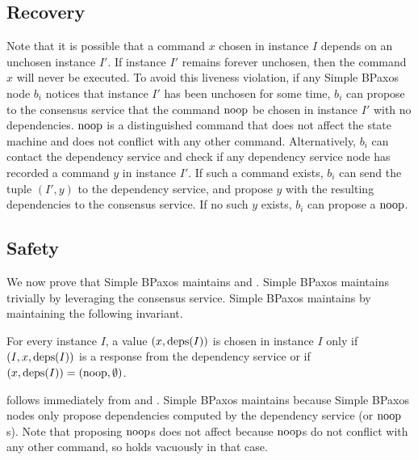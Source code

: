 \subsection{Recovery}
Note that it is possible that a command $x$ chosen in instance $I$ depends on
an unchosen instance $I'$. If instance $I'$ remains forever unchosen, then the
command $x$ will never be executed. To avoid this liveness violation, if any
Simple BPaxos node $b_i$ notices that instance $I'$ has been unchosen for some
time, $b_i$ can propose to the consensus service that the command $\text{noop}$ be
chosen in instance $I'$ with no dependencies. $\text{noop}$ is a distinguished
command that does not affect the state machine and does not conflict with any
other command.
%
Alternatively, $b_i$ can contact the dependency service and check if any
dependency service node has recorded a command $y$ in instance $I'$. If such a
command exists, $b_i$ can send the tuple $(I', y)$ to the dependency service,
and propose $y$ with the resulting dependencies to the consensus service. If no
such $y$ exists, $b_i$ can propose a $\text{noop}$.

\subsection{Safety}
We now prove that Simple BPaxos maintains  and
.
%
Simple BPaxos maintains  trivially by leveraging the
consensus service. Simple BPaxos maintains  by
maintaining the following invariant.

\begin{invariant}
  For every instance $I$, a value $(x, \text{deps}(I))$ is chosen in instance $I$
  only if $(I, x, \text{deps}(I))$ is a response from the dependency service or if
  $(x, \text{deps}(I)) = (\text{noop}, \emptyset)$.
\end{invariant}

 follows immediately from 
and . Simple BPaxos maintains
 because Simple BPaxos nodes only propose
dependencies computed by the dependency service (or $\text{noop}$s). Note that
proposing $\text{noop}$s does not affect  because
$\text{noop}$s do not conflict with any other command, so 
holds vacuously in that case.

